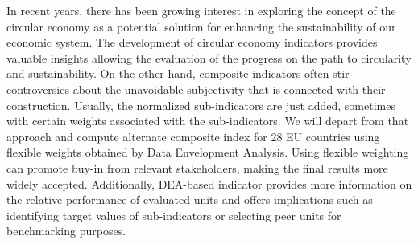 
\begin{Abstrakt}
    In recent years, there has been growing interest in exploring the concept of the circular economy as a potential solution for enhancing the sustainability of our economic system. The development of circular economy indicators provides valuable insights allowing the evaluation of the progress on the path to circularity and sustainability. On the other hand, composite indicators often stir controversies about the unavoidable subjectivity that is connected with their construction. Usually, the normalized sub-indicators are just added, sometimes with certain weights associated with the sub-indicators. We will depart from that approach and compute alternate composite index for 28 EU countries using flexible weights obtained by Data Envelopment Analysis. Using flexible weighting can promote buy-in from relevant stakeholders, making the final results more widely accepted. Additionally, DEA-based indicator provides more information on the relative performance of evaluated units and offers implications such as identifying target values of sub-indicators or selecting peer units for benchmarking purposes.
\end{Abstrakt}



\clearpage